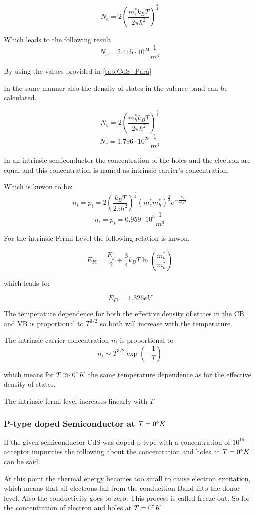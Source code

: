 $$ N_c = 2 \left( \frac{m_e^*k_BT}{2\pi\hbar^2}\right)^{\frac{3}{2}}$$

Which leads to the following result
$$ N_c = 2.415 \cdot 10^{24} \frac{1}{m^3}$$

By using the values provided in \autoref{tab:CdS_Para}

In the same manner also the density of states in the valence band can be
calculated.

$$ N_v = 2 \left( \frac{m_h^*k_BT}{2\pi\hbar^2}\right)^{\frac{3}{2}}$$
$$ N_v = 1.796 \cdot 10^{25} \frac{1}{m^3}$$

In an intrinsic semiconductor the concentration of the holes and the 
electron are equal and this concentration is named as
intrinsic carrier's concentration. 

Which is knwon to be:
$$n_i = p_i = 2 \left( \frac{k_BT}{2\pi\hbar^2} \right)^{\frac{3}{2}}
  (m_e^*m_h^*)^{\frac{3}{4}} e^{-\frac{E_g}{2k_BT}}$$
$$n_i = p_i = 0.959 \cdot 10^3 \frac{1}{m^3}$$

For the intrinsic Fermi Level the following relation is knwon,

$$E_{Fi} = \frac{E_g}{2} + \frac{3}{4} k_B T \ln\left( \frac{m_h^*}{m_e^*} \right)$$

which leads to:

$$E_{Fi} = 1.326 eV$$

The temperature dependence for both the effective density
of states in the CB and VB is proportional to $T^{3/2}$ so
both will increase with the temperature.

The intrinsic carrier concentration $n_i$ is proportional to
$$n_i \sim T^{3/2} \exp(-\frac{1}{T})$$

which means for $T \gg 0 \degree K$ the same temperature dependence as for the effective density of states.

The intrinsic fermi level increases linearly with $T$


\subsubsection*{P-type doped Semiconductor at $T=0\degree K$}

If the given semiconductor CdS was doped p-type with a
concentration of $10^{15}$ acceptor impurities the following
about the concentration and holes at $T=0\degree K$ can be said.

At this point the thermal energy becomes too small to cause electron excitation, which means that all electrons fall from
the conducition Band into the donor level. Also the conductivity
goes to zero. This process is called freeze out. 
So for the concentration of electron and holes at $T=0 \degree K$

